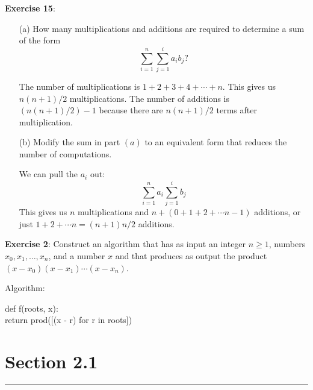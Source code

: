 \documentclass{article}
\begin{document}
\textbf{Exercise 15}:
    \begin{itemize}
        \item [(a)] How many multiplications and additions are required to determine a sum of the form 
            \begin{equation*}
                \sum_{i = 1}^{n} \sum_{j = 1}^{i}a_{i}b_{j}?
            \end{equation*}
            \begin{answer}
                The number of multiplications is $1 + 2 + 3 + 4 + \cdots + n$. This gives us $n(n + 1) / 2$ multiplications. The number of additions is $(n(n + 1) / 2) - 1$ because there are $n(n + 1) / 2$ terms after multiplication.
            \end{answer}

        \item [(b)] Modify the sum in part $(a)$ to an equivalent form that reduces the number of computations. 
            \begin{answer}
                We can pull the $a_{i}$ out:
                    \begin{equation*}
                        \sum_{i = 1}^{n}a_{i}\sum_{j = 1}^{i}b_{j}
                    \end{equation*}
                This gives us $n$ multiplications and $n + (0 + 1 + 2 + \cdots n - 1)$ additions, or just $1 + 2 + \cdots n = (n + 1)n / 2$ additions.
            \end{answer}
    \end{itemize}

\textbf{Exercise 2}:
    Construct an algorithm that has as input an integer $n \geq 1$, numbers $x_{0}, x_{1}, \ldots, x_{n}$, and a number $x$ and that produces as output the product $(x - x_{0})(x - x_{1}) \cdots (x - x_{n})$.
        \begin{answer}
            Algorithm:
            \begin{center}
                def f(roots, x): \\
                \hspace{5cm} return prod([(x - r) for r in roots])
            \end{center}
        \end{answer}

\newpage
\section*{Section 2.1}
\hrule
\end{document}
